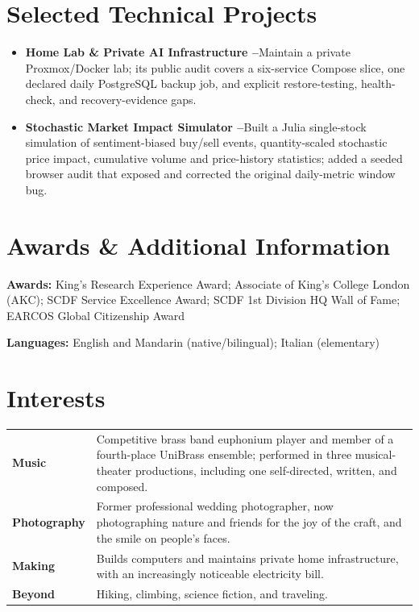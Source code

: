 \documentclass[11pt,a4paper]{extarticle}
\newcommand{\project}[2]{\textbf{#1}\hspace{0.35em}#2}
\begin{document}
\section{Selected Technical Projects}
\begin{itemize}
  \item \project{Home Lab \& Private AI Infrastructure --}{Maintain a private Proxmox/Docker lab; its public audit covers a six-service Compose slice, one declared daily PostgreSQL backup job, and explicit restore-testing, health-check, and recovery-evidence gaps.}
  \item \project{Stochastic Market Impact Simulator --}{Built a Julia single-stock simulation of sentiment-biased buy/sell events, quantity-scaled stochastic price impact, cumulative volume and price-history statistics; added a seeded browser audit that exposed and corrected the original daily-metric window bug.}
\end{itemize}

\section{Awards \& Additional Information}
\textbf{Awards:} King's Research Experience Award; Associate of King's College London (AKC); SCDF Service Excellence Award; SCDF 1st Division HQ Wall of Fame; EARCOS Global Citizenship Award

\textbf{Languages:} English and Mandarin (native/bilingual); Italian (elementary)

\section{Interests}
\begin{tabularx}{\textwidth}{@{}>{\bfseries}l@{\hspace{0.7em}}>{\raggedright\arraybackslash}X@{}}
Music & Competitive brass band euphonium player and member of a fourth-place UniBrass ensemble; performed in three musical-theater productions, including one self-directed, written, and composed.\\[1pt]
Photography & Former professional wedding photographer, now photographing nature and friends for the joy of the craft, and the smile on people's faces.\\[1pt]
Making & Builds computers and maintains private home infrastructure, with an increasingly noticeable electricity bill.\\[1pt]
Beyond & Hiking, climbing, science fiction, and traveling.
\end{tabularx}
\end{document}
